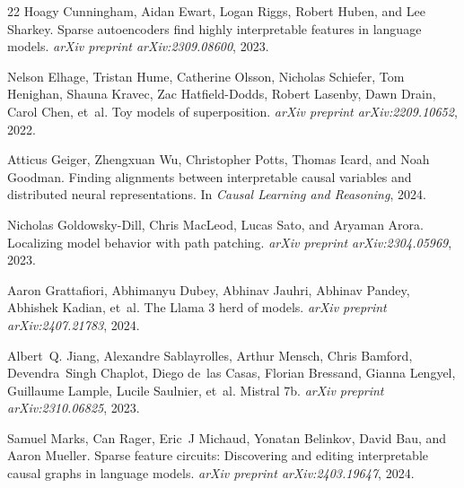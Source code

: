 \documentclass[11pt]{article}
\begin{document}
\begin{thebibliography}{22}
Hoagy Cunningham, Aidan Ewart, Logan Riggs, Robert Huben, and Lee Sharkey.
\newblock Sparse autoencoders find highly interpretable features in language
  models.
\newblock \emph{arXiv preprint arXiv:2309.08600}, 2023.

Nelson Elhage, Tristan Hume, Catherine Olsson, Nicholas Schiefer, Tom Henighan,
  Shauna Kravec, Zac Hatfield-Dodds, Robert Lasenby, Dawn Drain, Carol Chen,
  et~al.
\newblock Toy models of superposition.
\newblock \emph{arXiv preprint arXiv:2209.10652}, 2022.

Atticus Geiger, Zhengxuan Wu, Christopher Potts, Thomas Icard, and Noah
  Goodman.
\newblock Finding alignments between interpretable causal variables and
  distributed neural representations.
\newblock In \emph{Causal Learning and Reasoning}, 2024.

Nicholas Goldowsky-Dill, Chris MacLeod, Lucas Sato, and Aryaman Arora.
\newblock Localizing model behavior with path patching.
\newblock \emph{arXiv preprint arXiv:2304.05969}, 2023.

Aaron Grattafiori, Abhimanyu Dubey, Abhinav Jauhri, Abhinav Pandey, Abhishek
  Kadian, et~al.
\newblock The {Llama} 3 herd of models.
\newblock \emph{arXiv preprint arXiv:2407.21783}, 2024.

Albert~Q. Jiang, Alexandre Sablayrolles, Arthur Mensch, Chris Bamford,
  Devendra~Singh Chaplot, Diego de~las Casas, Florian Bressand, Gianna Lengyel,
  Guillaume Lample, Lucile Saulnier, et~al.
\newblock Mistral 7b.
\newblock \emph{arXiv preprint arXiv:2310.06825}, 2023.

Samuel Marks, Can Rager, Eric~J Michaud, Yonatan Belinkov, David Bau, and Aaron
  Mueller.
\newblock Sparse feature circuits: Discovering and editing interpretable causal
  graphs in language models.
\newblock \emph{arXiv preprint arXiv:2403.19647}, 2024.


\end{thebibliography}
\end{document}
